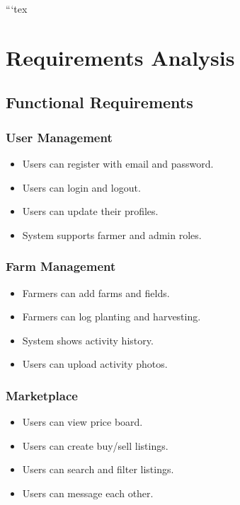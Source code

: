 ```tex
\section{Requirements Analysis}

\subsection{Functional Requirements}

\subsubsection{User Management}
\begin{itemize}[leftmargin=*]
	\item Users can register with email and password.
	\item Users can login and logout.
	\item Users can update their profiles.
	\item System supports farmer and admin roles.
\end{itemize}

\subsubsection{Farm Management}
\begin{itemize}[leftmargin=*]
	\item Farmers can add farms and fields.
	\item Farmers can log planting and harvesting.
	\item System shows activity history.
	\item Users can upload activity photos.
\end{itemize}

\subsubsection{Marketplace}
\begin{itemize}[leftmargin=*]
	\item Users can view price board.
	\item Users can create buy/sell listings.
	\item Users can search and filter listings.
	\item Users can message each other.
\end{itemize}

